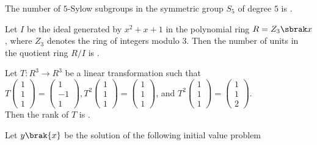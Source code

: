 \iffalse
\chapter{2021}
\author{EE24BTECH11037}
\section{ma}
\fi


    \item The number of $5$-Sylow subgroups in the symmetric group $S_5$ of degree $5$ is \underline{\hspace{1.5cm}}.
    \item Let $I$ be the ideal generated by $x^2+x+1$ in the polynomial ring $R=Z_3\sbrak x$, where $Z_3$ denotes the ring of integers modulo $3$. Then the number of units in the quotient ring $R/I$ is \underline{\hspace{1.5cm}}.
   \item Let $T:R^3 \rightarrow R^3$ be a linear transformation such that\\
   $\displaystyle T\begin{pmatrix}
1\\
1\\
1
\end{pmatrix}=\begin{pmatrix}
1\\
-1\\
1
\end{pmatrix}, T^2\begin{pmatrix}
1\\
1\\
1
\end{pmatrix}=\begin{pmatrix}
1\\
1\\
1
\end{pmatrix}$, and $\displaystyle T^2\begin{pmatrix}
1\\
1\\
1
\end{pmatrix}=\begin{pmatrix}
1\\
1\\
2
\end{pmatrix}$.\\ Then the rank of $T$ is \underline{\hspace{1.5cm}}.
    \item Let $y\brak{x}$ be the solution of the following initial value problem\\
